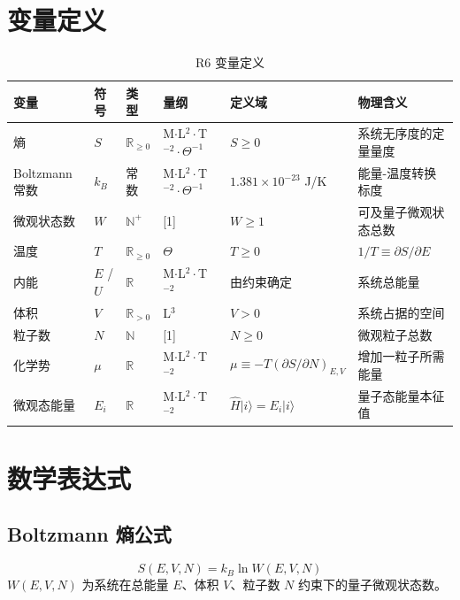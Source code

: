 \section{变量定义}

\begin{table}[h]
\centering
\small
\begin{tabular}{p{2.2cm}p{1.6cm}p{2cm}p{2.2cm}p{3cm}p{3.5cm}}
\toprule
\textbf{变量} & \textbf{符号} & \textbf{类型} & \textbf{量纲} & \textbf{定义域} & \textbf{物理含义} \\
\midrule
熵 & $S$ & $\mathbb{R}_{\ge 0}$ & M$\cdot$L$^2\cdot$T$^{-2}\cdot\Theta^{-1}$ & $S \ge 0$ & 系统无序度的定量量度 \\
Boltzmann 常数 & $k_B$ & 常数 & M$\cdot$L$^2\cdot$T$^{-2}\cdot\Theta^{-1}$ & $1.381\times10^{-23}$ J/K & 能量-温度转换标度 \\
微观状态数 & $W$ & $\mathbb{N}^+$ & [1] & $W \ge 1$ & 可及量子微观状态总数 \\
温度 & $T$ & $\mathbb{R}_{\ge 0}$ & $\Theta$ & $T \ge 0$ & $1/T \equiv \partial S/\partial E$ \\
内能 & $E$ / $U$ & $\mathbb{R}$ & M$\cdot$L$^2\cdot$T$^{-2}$ & 由约束确定 & 系统总能量 \\
体积 & $V$ & $\mathbb{R}_{>0}$ & L$^3$ & $V > 0$ & 系统占据的空间 \\
粒子数 & $N$ & $\mathbb{N}$ & [1] & $N \ge 0$ & 微观粒子总数 \\
化学势 & $\mu$ & $\mathbb{R}$ & M$\cdot$L$^2\cdot$T$^{-2}$ & $\mu \equiv -T(\partial S/\partial N)_{E,V}$ & 增加一粒子所需能量 \\
微观态能量 & $E_i$ & $\mathbb{R}$ & M$\cdot$L$^2\cdot$T$^{-2}$ & $\hat{H}|i\rangle = E_i|i\rangle$ & 量子态能量本征值 \\
\bottomrule
\end{tabular}
\caption{R6 变量定义}
\end{table}

\section{数学表达式}

\subsection{Boltzmann 熵公式}
\[
S(E, V, N) = k_B \ln W(E, V, N)
\]
$W(E,V,N)$ 为系统在总能量 $E$、体积 $V$、粒子数 $N$ 约束下的量子微观状态数。


